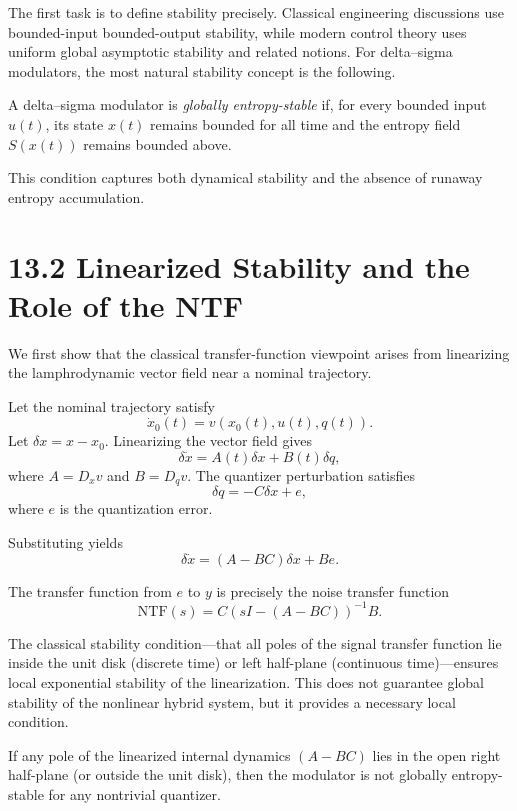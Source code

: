 The first task is to define stability precisely. Classical engineering discussions use bounded-input bounded-output stability, while modern control theory uses uniform global asymptotic stability and related notions. For delta--sigma modulators, the most natural stability concept is the following.

\begin{definition}
A delta--sigma modulator is \emph{globally entropy-stable} if, for every bounded input $u(t)$, its state $x(t)$ remains bounded for all time and the entropy field $S(x(t))$ remains bounded above.
\end{definition}

This condition captures both dynamical stability and the absence of runaway entropy accumulation.

\section*{13.2 Linearized Stability and the Role of the NTF}

We first show that the classical transfer-function viewpoint arises from linearizing the lamphrodynamic vector field near a nominal trajectory.

Let the nominal trajectory satisfy
\[
\dot{x}_0(t) = v(x_0(t),u(t),q(t)).
\]
Let $\delta x = x - x_0$. Linearizing the vector field gives
\[
\delta \dot{x} = A(t) \delta x + B(t) \delta q,
\]
where $A = D_x v$ and $B = D_q v$. The quantizer perturbation satisfies
\[
\delta q = -C \delta x + e,
\]
where $e$ is the quantization error.

Substituting yields
\[
\delta \dot{x} = (A - BC) \delta x + B e.
\]

The transfer function from $e$ to $y$ is precisely the noise transfer function
\[
\mathrm{NTF}(s) = C (sI - (A - BC))^{-1} B.
\]

The classical stability condition---that all poles of the signal transfer function lie inside the unit disk (discrete time) or left half-plane (continuous time)---ensures local exponential stability of the linearization. This does not guarantee global stability of the nonlinear hybrid system, but it provides a necessary local condition.

\begin{theorem}
If any pole of the linearized internal dynamics $(A - BC)$ lies in the open right half-plane (or outside the unit disk), then the modulator is not globally entropy-stable for any nontrivial quantizer.
\end{theorem}

